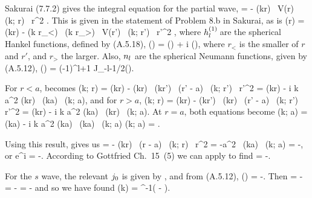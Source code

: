 \begin{solution}
	Sakurai (7.7.2) gives the integral equation for the partial wave,
	\beqn \label{delint}
		 = - \intoi \jl(kr) \, V(r) \, \Al(k; r) \, r^2 \dr.
	\eeqn
	This is given in the statement of Problem 8.b in Sakurai, as is
	\beqn \label{radint}
		\Al(r) = \jl(kr) -  \intoi \jl(k r_<) \, \hql(k r_>) \, V(r') \, \Al(k; r') \, {r'}^2 \drp,
	\eeqn
	where $h_l^{(1)}\!$ are the spherical Hankel functions, defined by (A.5.18),
	\beqn \label{hankel}
		\hql(\rho) = \jl(\rho) + i \nl(\rho),
	\eeqn
	where $r_<$ is the smaller of $r$ and $r'$, and $r_>$ the larger.  Also, $n_l$ are the spherical Neumann functions, given by (A.5.12),
	\beq
		\nl(\rho) = (-1)^{l+1} \sqrt{\frac{\pi}{2\rho}} J_{-l-1/2}(\rho).
	\eeq
	
	For $r < a$,  becomes
	\beq
		\Al(k; r) = \jl(kr) -  \intoi \jl(kr) \, \hql(kr') \,  \del(r' - a) \, \Al(k; r') \, {r'}^2 \drp
		= \jl(kr) - i k a^2 \gam \jl(kr) \, \hql(ka) \, \Al(k; a),
	\eeq
	and for $r > a$,
	\beq
		\Al(k; r) = \jl(kr) -  \intoi \jl(kr') \, \hql(kr) \,  \del(r' - a) \, \Al(k; r') \, {r'}^2 \drp
		= \jl(kr) - i k a^2 \gam \jl(ka) \, \hql(kr) \, \Al(k; a).
	\eeq
	At $r = a$, both equations become
	\beq
		\Al(k; a) = \jl(ka) - i k a^2 \gam \hql(ka) \, \jl(ka) \, \Al(k; a)
		\qimplies
		\Al(k; a) = .
	\eeq
	
	Using this result,  gives us
	\beq
		 = - \intoi \jl(kr) \,  \del(r - a) \, \Al(k; r) \, r^2 \dr
		= -a^2 \gam \, \jl(ka) \, \Al(k; a)
		= -,
	\eeq
	or
	\beqn \label{sindelo}
		e^{i \dell} \sin\dell = -.
	\eeqn
	According to Gottfried Ch.~15~(5) we can apply  to find
	\beq
		\tan\dell = -.
	\eeq
	
	For the $s$ wave, the relevant $j_0$ is given by , and from (A.5.12),
	\beqn \label{no}
		\no(\rho) = -\frac{\cos\rho}{\rho}.
	\eeqn
	Then
	\beqn \label{tandelo}
		\tan\delo = -
		= -
		= -
	\eeqn
	and so we have found
	\beqn \label{delo}
		\delo(k) = \tan^{-1}\!\!\left( - \right).
	\eeqn
	\vfix
\end{solution}



